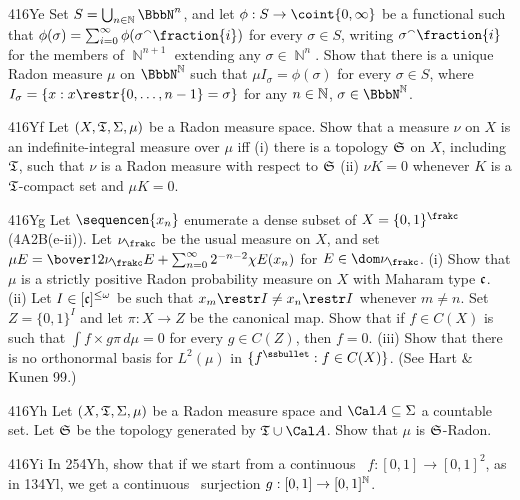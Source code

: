 {\spheader 416Ye Set $S=\bigcup_{n\in\Bbb N}\BbbN^n$, and let
$\phi:S\to\coint{0,\infty}$ be a functional such that
$\phi(\sigma)=\sum_{i=0}^{\infty}\phi(\sigma^{\smallfrown}\fraction{i})$ for every
$\sigma\in S$, writing $\sigma^{\smallfrown}\fraction{i}$ for the
members of
$\BbbN^{n+1}$ extending any $\sigma\in\BbbN^n$.   Show that there is a
unique Radon measure $\mu$ on $\BbbN^{\Bbb N}$ such that
$\mu I_{\sigma}=\phi(\sigma)$ for every $\sigma\in S$, where
$I_{\sigma}=\{x:x\restr\{0,\ldots,n-1\}=\sigma\}$ for any $n\in\Bbb N$,
$\sigma\in\BbbN^{\Bbb N}$.  

\spheader 416Yf Let $(X,\frak T,\Sigma,\mu)$ be a Radon measure space.
Show that a measure $\nu$ on $X$ is an indefinite-integral measure over
$\mu$ iff (i) there is a topology $\frak S$ on $X$, including $\frak T$,
such that $\nu$ is a Radon measure with respect to $\frak S$
(ii) $\nu K=0$ whenever $K$ is a $\frak T$-compact set and $\mu K=0$.

\spheader 416Yg Let $\sequencen{x_n}$ enumerate a dense subset of
$X=\{0,1\}^{\frakc}$ (4A2B(e-ii)).   Let $\nu_{\frakc}$ be the usual
measure on $X$, and set
$\mu E=\bover12\nu_{\frakc} E+\sum_{n=0}^{\infty}2^{-n-2}\chi E(x_n)$ for
$E\in\dom\nu_{\frakc}$.   (i) Show that $\mu$ is a strictly positive Radon
probability measure on $X$ with Maharam type $\frak c$.   (ii) Let
$I\in[\frak c]^{\le\omega}$ be such that $x_m\restr I\ne x_n\restr I$
whenever $m\ne n$.   Set $Z=\{0,1\}^I$ and let $\pi:X\to Z$ be the
canonical map.   Show that if $f\in C(X)$ is such that
$\int f\times g\pi\,d\mu=0$ for every $g\in C(Z)$, then $f=0$.
   (iii) Show that there is no orthonormal
basis for $L^2(\mu)$ in $\{f^{\ssbullet}:f\in C(X)\}$.
(See {\smc Hart \& Kunen 99}.)

\spheader 416Yh
Let $(X,\frak T,\Sigma,\mu)$ be a Radon measure space and
$\Cal A\subseteq\Sigma$ a countable set.   Let $\frak S$ be the topology
generated by $\frak T\cup\Cal A$.   Show that $\mu$ is $\frak S$-Radon.

\spheader 416Yi
In 254Yh\Latereditions, show that if we start from a continuous
\imp\ $f:[0,1]\to[0,1]^2$, as in 134Yl, we get a continuous \imp\
surjection $g:[0,1]\to[0,1]^{\Bbb N}$.
}%

